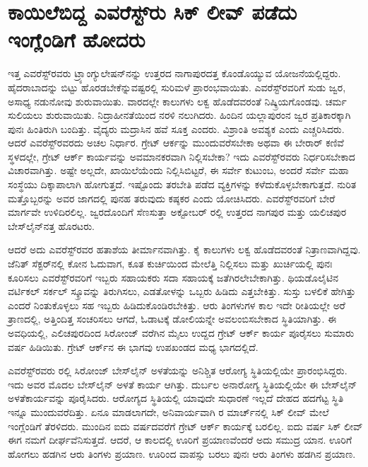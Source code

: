 
\chapter{ಕಾಯಿಲೆಬಿದ್ದ ಎವರೆಸ್ಟ್​ರು ಸಿಕ್​ ಲೀವ್​ ಪಡೆದು ಇಂಗ್ಲೆಂಡಿಗೆ ಹೋದರು}

ಇತ್ತ ಎವರೆಸ್ಟ್​ರವರು ಟ್ರ್ಯಾಂಗ್ಯುಲೇಷನ್​ನನ್ನು ಉತ್ತರದ ನಾಗಾಪುರದತ್ತ ಕೊಂಡೊಯ್ಯುವ ಯೋಜನೆಯಲ್ಲಿದ್ದರು. ಹೈದರಾಬಾದನ್ನು ಬಿಟ್ಟು ಹೊರಡಬೇಕೆನ್ನುವಷ್ಟರಲ್ಲಿ ಸುರಿಮಳೆ ಪ್ರಾರಂಭವಾಯಿತು. ಎವರೆಸ್ಟ್​ರವರಿಗೆ ಸುಡು ಜ್ವರ, ಅಸಾಧ್ಯ ನಡುನೋವು ಶುರುವಾಯಿತು. ವಾರದಲ್ಲೇ ಕಾಲುಗಳು ಲಕ್ವ ಹೊಡೆದವರಂತೆ ನಿಷ್ಕ್ರಿಯಗೊಂಡವು. ಚರ್ಮ ಸುಲಿಯಲು ಶುರುವಾಯಿತು. ನಿದ್ರಾಹೀನತೆಯಿಂದ ನರಳಿ ನಲುಗಿದರು. ಹಿಂದಿನ ಯಲ್ಲಾಪುರಂನ ಜ್ವರ ಪ್ರತಿಕಾರಕ್ಕಾಗಿ ಪುನಃ ಹಿಂತಿರುಗಿ ಬಂದಿತ್ತು. ವೈದ್ಯರು ಮದ್ರಾಸಿನ ಹವೆ ಸೂಕ್ತ ಎಂದರು. ವಿಶ್ರಾಂತಿ ಅವಶ್ಯಕ ಎಂದು ಎಚ್ಚರಿಸಿದರು. ಆದರೆ ಎವರೆಸ್ಟ್​ರವರದು ಅಚಲ ನಿರ್ಧಾರ. ಗ್ರೇಟ್​ ಆರ್ಕನ್ನು ಮುಂದುವರೆಸಬೇಕಾ ಅಥವಾ ಈ ಬೇರಾರ್​ ಕಣಿವೆ ಸ್ಥಳದಲ್ಲೇ, ಗ್ರೇಟ್​ ಆರ್ಕ್ ಕಾರ್ಯವನ್ನು ಅವಮಾನಕರವಾಗಿ ನಿಲ್ಲಿಸಬೇಕಾ? ಇದು ಎವರೆಸ್ಟ್​ರವರು ನಿರ್ಧರಿಸಬೇಕಾದ ವಿಚಾರವಾಗಿತ್ತು. ಅಷ್ಟೇ ಅಲ್ಲದೇ, ಖಾಯಿಲೆಯೆಂದು ನಿಲ್ಲಿಸಿಬಿಟ್ಟರೆ, ಈ ಸರ್ವೇ ಕುಟುಂಬ, ಅಂದರೆ ಸರ್ವೇ ಮಹಾ ಸಂಸ್ಥೆಯು ದಿಕ್ಕಾಪಾಲಾಗಿ ಹೋಗುತ್ತದೆ. ಇಷ್ಟೊಂದು ತರಬೇತಿ ಪಡೆದ ವ್ಯಕ್ತಿಗಳನ್ನು ಕಳೆದುಕೊಳ್ಳಬೇಕಾಗುತ್ತದೆ. ನುರಿತ ಮತ್ತೊಬ್ಬರನ್ನು ಅವರ ಜಾಗದಲ್ಲಿ ಪುನಹ ತರುವುದು ಕಷ್ಠಕರ ಎಂದು ಯೋಚಿಸಿದರು. ಎವರೆಸ್ಟ್​ರವರಿಗೆ ಬೇರೆ ಮಾರ್ಗವೇ ಉಳಿದಿರಲಿಲ್ಲ. ಜ್ವರದೊಂದಿಗೆ ಸೆಣಸುತ್ತಾ ಅಕ್ಟೋಬರ್​ ರಲ್ಲಿ ಉತ್ತರದ ನಾಗಪುರ ಮತ್ತು ಯಲಿಚಪುರ ಬೇಸ್‌ಲೈನ್​ನತ್ತ ಹೊರಟರು.

ಆದರೆ ಅದು ಎವರೆಸ್ಟ್​ರವರ ಹತಾಶೆಯ ತೀರ್ಮಾನವಾಗಿತ್ತು. ಕೈ ಕಾಲುಗಳು ಲಕ್ವ ಹೊಡೆದವರಂತೆ ನಿತ್ರಾಣವಾಗಿದ್ದವು. ಜೆನಿತ್​ ಸೆಕ್ಟರ್​ನಲ್ಲಿ ಕೋನ ಓದುವಾಗ, ಕೂತ ಕುರ್ಚಿಯಿಂದ ಮೇಲೆತ್ತಿ ನಿಲ್ಲಿಸಲು ಮತ್ತು ಖುರ್ಚಿಯಲ್ಲಿ ಪುನಃ ಕೂರಿಸಲು ಎವರೆಸ್ಟ್​ರವರಿಗೆ ಇಬ್ಬರು ಸಹಾಯಕರು ಸದಾ ಸಹಾಯಕ್ಕೆ ಜತೆಗಿರಲೇಬೇಕಾಗಿತ್ತು. ಥಿಯಡೊಲೈಟಿನ ವರ್ಟಿಕಲ್​ ಸರ್ಕಲ್​ ಸ್ಕ್ರೂವನ್ನು ತಿರುಗಿಸಲು, ಎಡತೋಳನ್ನು ಒಬ್ಬರು ಹಿಡಿದು ಎತ್ತಬೇಕಿತ್ತು. ಸುಸ್ತು ಬಳಲಿಕೆ ಹೇಗಿತ್ತು ಎಂದರೆ ನಿಂತುಕೊಳ್ಳಲು ಸಹ ಇಬ್ಬರು ಹಿಡಿದುಕೊಂಡಿರಬೇಕಿತ್ತು. ಆರು ತಿಂಗಳುಗಳ ಕಾಲ ಇದೇ ರೀತಿಯಲ್ಲೇ ಅರೆ ತ್ರಾಣದಲ್ಲಿ, ಅತ್ತಿಂದಿತ್ತ ಸಂಚರಿಸಲು ಆಗದೆ, ಓಡಾಟಕ್ಕೆ ಡೋಲಿಯನ್ನೇ ಅವಲಂಬಿಸಬೇಕಾದ ಸ್ಥಿತಿಯಾಗಿತ್ತು. ಈ ಅವಧಿಯಲ್ಲಿ, ಎಲಿಚಪುರದಿಂದ ಸಿರೋಂಜ್​ ವರೆಗಿನ  ಮೈಲು ಉದ್ದದ ಗ್ರೇಟ್​ ಆರ್ಕ್ ಕಾರ್ಯ ಪೂರೈಸಲು ಸುಮಾರು  ವರ್ಷ ಹಿಡಿಯಿತು. ಗ್ರೇಟ್​ ಆರ್ಕ್‌ನ ಈ ಭಾಗವು ಉಪಖಂಡದ ಮಧ್ಯ ಭಾಗದಲ್ಲಿದೆ.

ಎವರೆಸ್ಟ್​ರವರು ರಲ್ಲಿ ಸಿರೋಂಜ್​ ಬೇಸ್​ಲೈನ್​ ಅಳತೆಯನ್ನು ಅನಿಶ್ಚಿತ ಆರೋಗ್ಯ ಸ್ಥಿತಿಯಲ್ಲಿಯೇ ಪ್ರಾರಂಭಿಸಿದ್ದರು. ಇದು ಅವರ ಮೊದಲ ಬೇಸ್‌ಲೈನ್​ ಅಳತೆ ಕಾರ್ಯ ಆಗಿತ್ತು. ದುರ್ಬಲ ಅನಾರೋಗ್ಯ ಸ್ಥಿತಿಯಲ್ಲಿಯೇ ಈ ಬೇಸ್‌ಲೈನ್​ ಅಳತೆಕಾರ್ಯವನ್ನು ಪೂರೈಸಿದರು. ಆರೋಗ್ಯದ ಸ್ಥಿತಿಯಲ್ಲಿ ಯಾವುದೇ ಸುಧಾರಣೆ ಇಲ್ಲದೆ ದೇಹದ ಹದಗೆಟ್ಟ ಸ್ಥಿತಿ ಇನ್ನೂ ಮುಂದುವರೆದಿತ್ತು. ಏನೂ ಮಾಡಲಾಗದೇ, ಅನಿವಾರ್ಯವಾಗಿ ರ ಮಾರ್ಚ್‌ನಲ್ಲಿ ಸಿಕ್​ ಲೀವ್​ ಮೇಲೆ ಇಂಗ್ಲೆಂಡಿಗೆ ತೆರಳಿದರು. ಮುಂದಿನ ಐದು ವರ್ಷದವರೆಗೆ ಗ್ರೇಟ್​ ಆರ್ಕ್ ಕಾರ್ಯಕ್ಕೆ ಬರಲಿಲ್ಲ. ಐದು ವರ್ಷ ಸಿಕ್​ ಲೀವ್​ ಈಗ ನಮಗೆ ದೀರ್ಘವೆನಿಸುತ್ತದೆ. ಆದರೆ, ಆ ಕಾಲದಲ್ಲಿ ಊರಿಗೆ ಪ್ರಯಾಣವೆಂದರೆ ಅದು ಸಮುದ್ರ ಯಾನ. ಊರಿಗೆ ಹೋಗಲು ಹಡಗಿನ ಆರು ತಿಂಗಳು ಪ್ರಯಾಣ. ಊರಿಂದ ವಾಪಸ್ಸು ಬರಲು ಪುನಃ ಆರು ತಿಂಗಳು ಹಡಗಿನ ಪ್ರಯಾಣ.

